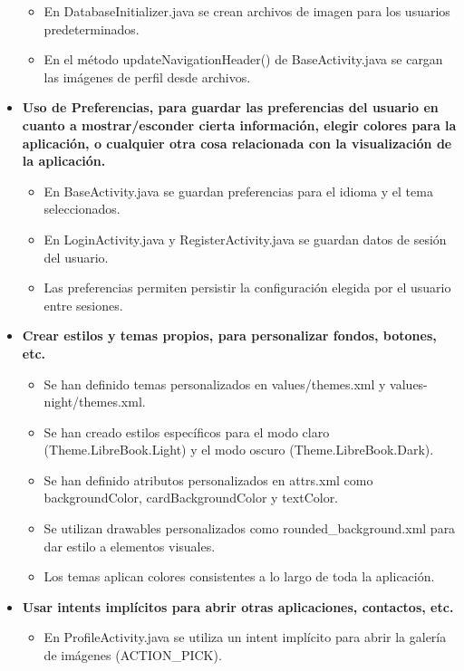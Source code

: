 \documentclass[a4paper,12pt]{report}
\begin{document}
\begin{itemize}
\begin{itemize}
          \item En DatabaseInitializer.java se crean archivos de imagen para los usuarios predeterminados.
          \item En el método updateNavigationHeader() de BaseActivity.java se cargan las imágenes de perfil desde archivos.
        \end{itemize}
        \item \textbf{Uso de Preferencias, para guardar las preferencias del usuario en cuanto a mostrar/esconder cierta información, elegir colores para la aplicación, o cualquier otra cosa relacionada con la visualización de la aplicación.}
        \begin{itemize}
          \item En BaseActivity.java se guardan preferencias para el idioma y el tema seleccionados.
          \item En LoginActivity.java y RegisterActivity.java se guardan datos de sesión del usuario.
          \item Las preferencias permiten persistir la configuración elegida por el usuario entre sesiones.
        \end{itemize}
        \item \textbf{Crear estilos y temas propios, para personalizar fondos, botones, etc.}
        \begin{itemize}
          \item Se han definido temas personalizados en values/themes.xml y values-night/themes.xml.
          \item Se han creado estilos específicos para el modo claro (Theme.LibreBook.Light) y el modo oscuro (Theme.LibreBook.Dark).
          \item Se han definido atributos personalizados en attrs.xml como backgroundColor, cardBackgroundColor y textColor.
          \item Se utilizan drawables personalizados como rounded\_background.xml para dar estilo a elementos visuales.
          \item Los temas aplican colores consistentes a lo largo de toda la aplicación.
        \end{itemize}
        \item \textbf{Usar intents implícitos para abrir otras aplicaciones, contactos, etc.}
        \begin{itemize}
          \item En ProfileActivity.java se utiliza un intent implícito para abrir la galería de imágenes (ACTION\_PICK).

\end{itemize}
\end{itemize}
\end{document}
